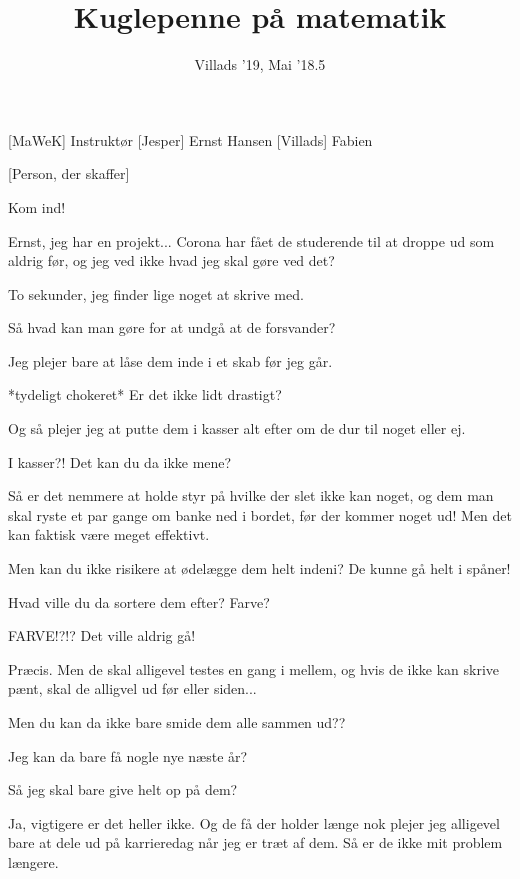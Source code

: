 \documentclass[a4paper,11pt]{article}
\title{Kuglepenne på matematik}
\author{Villads '19, Mai '18.5}
\begin{document}
\maketitle

\begin{roles}
[MaWeK] Instruktør
[Jesper] Ernst Hansen
[Villads] Fabien
\end{roles}

\begin{props}
[Person, der skaffer]
\end{props}


\begin{sketch}

 Kom ind!

 Ernst, jeg har en projekt... Corona har fået de studerende til at droppe ud som aldrig før, og jeg ved ikke hvad jeg skal gøre ved det?

 To sekunder, jeg finder lige noget at skrive med.


 Så hvad kan man gøre for at undgå at de forsvander?

 Jeg plejer bare at låse dem inde i et skab før jeg går.

 *tydeligt chokeret* Er det ikke lidt drastigt?

 Og så plejer jeg at putte dem i kasser alt efter om de dur til noget eller ej.

 I kasser?! Det kan du da ikke mene?

 Så er det nemmere at holde styr på hvilke der slet ikke kan noget, og dem man skal ryste et par gange om banke ned i bordet, før der kommer noget ud! Men det kan faktisk være meget effektivt.

 Men kan du ikke risikere at ødelægge dem helt indeni? De kunne gå helt i spåner!

 Hvad ville du da sortere dem efter? Farve?

 FARVE!?!? Det ville aldrig gå!

 Præcis. Men de skal alligevel testes en gang i mellem, og hvis de ikke kan skrive pænt, skal de alligvel ud før eller siden...

 Men du kan da ikke bare smide dem alle sammen ud??

 Jeg kan da bare få nogle nye næste år?

 Så jeg skal bare give helt op på dem?

 Ja, vigtigere er det heller ikke. Og de få der holder længe nok plejer jeg alligevel bare at dele ud på karrieredag når jeg er træt af dem. Så er de ikke mit problem længere.

\end{sketch}
\end{document}
